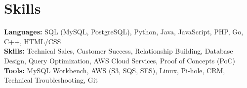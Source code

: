 \documentclass[11pt]{article}       %
\begin{document}
\vspace{-18.5pt}


\section*{Skills}
\textbf{Languages:} SQL (MySQL, PostgreSQL), Python, Java, JavaScript, PHP, Go, C++, HTML/CSS\\
\textbf{Skills:} Technical Sales, Customer Success, Relationship Building, Database Design, Query Optimization, AWS Cloud Services, Proof of Concepts (PoC)\\
\textbf{Tools:} MySQL Workbench, AWS (S3, SQS, SES), Linux, Pi-hole, CRM, Technical Troubleshooting, Git\\

\vspace{-6.5pt}
\end{document}
